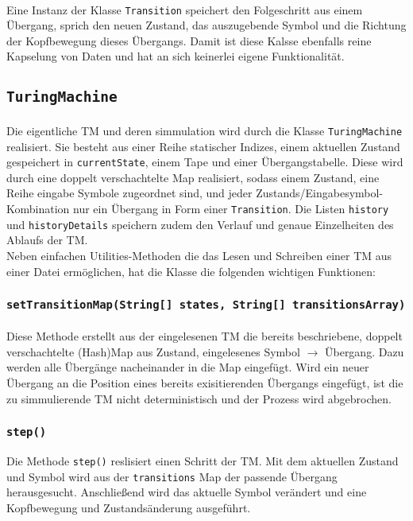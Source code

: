 \documentclass[10pt, a4paper]{article}
\newcommand{\ilc}{\texttt}
\begin{document}
\paragraph*{}
Eine Instanz der Klasse \ilc{Transition} speichert den Folgeschritt aus einem Übergang, sprich den neuen Zustand, das auszugebende Symbol und die Richtung der Kopfbewegung dieses Übergangs. Damit ist diese Kalsse ebenfalls reine Kapselung von Daten und hat an sich keinerlei eigene Funktionalität.
\par
\subsection*{\ilc{TuringMachine}}
\paragraph*{}
Die eigentliche TM und deren simmulation wird durch die Klasse \ilc{TuringMachine} realisiert. Sie besteht aus einer Reihe statischer Indizes, einem aktuellen Zustand gespeichert in \ilc{currentState}, einem Tape und einer Übergangstabelle. Diese wird durch eine doppelt verschachtelte Map realisiert, sodass einem Zustand, eine Reihe eingabe Symbole zugeordnet sind, und jeder Zustands/Eingabesymbol-Kombination nur ein Übergang in Form einer \ilc{Transition}.
Die Listen \ilc{history} und \ilc{historyDetails} speichern zudem den Verlauf und genaue Einzelheiten des Ablaufs der TM.\\
Neben einfachen Utilities-Methoden die das Lesen und Schreiben einer TM aus einer Datei ermöglichen, hat die Klasse die folgenden wichtigen Funktionen:\par
\subsubsection*{\ilc{setTransitionMap(String[] states, String[] transitionsArray)}}
\paragraph*{}
Diese Methode erstellt aus der eingelesenen TM die bereits beschriebene, doppelt verschachtelte (Hash)Map aus Zustand, eingelesenes Symbol $\rightarrow$ Übergang. Dazu werden alle Übergänge nacheinander in die Map eingefügt. Wird ein neuer Übergang an die Position eines bereits exisitierenden Übergangs eingefügt, ist die zu simmulierende TM nicht deterministisch und der Prozess wird abgebrochen.\par
\subsubsection*{\ilc{step()}}
Die Methode \ilc{step()} reslisiert einen Schritt der TM. Mit dem aktuellen Zustand und Symbol wird aus der \ilc{transitions} Map der passende Übergang herausgesucht. Anschließend wird das aktuelle Symbol verändert und eine Kopfbewegung und Zustandsänderung ausgeführt.
\end{document}
